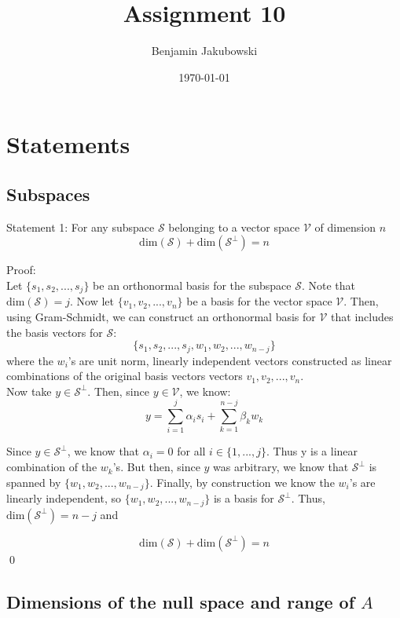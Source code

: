 \documentclass[paper=a4, fontsize=11pt]{scrartcl} %
\title{	Assignment 10}
\author{Benjamin Jakubowski} %
\date{\normalsize\today} %
\numberwithin{equation}{section} %
\numberwithin{figure}{section} %
\numberwithin{table}{section} %
\begin{document}
\maketitle %


\section{Statements}

\subsection{Subspaces}
Statement 1: For any subspace $\mathcal{S}$ belonging to a vector space $\mathcal{V}$ of dimension $n$
\[ \mathrm{dim} (\mathcal{S}) + \mathrm{dim} (\mathcal{S^{\perp}}) = n\]

Proof:\\
Let $\{s_1, s_2, ..., s_j\}$ be an orthonormal basis for the subspace $\mathcal{S}$. Note that $\mathrm{dim}(\mathcal{S}) = j$. Now let $\{v_1, v_2, ..., v_n\}$ be a basis for the vector space $\mathcal{V}$. Then, using Gram-Schmidt, we can construct an orthonormal basis for $\mathcal{V}$ that includes the basis vectors for $\mathcal{S}$:
\[\{s_1, s_2, ..., s_j, w_1, w_2, ..., w_{n-j}\}\]
where the $w_i$'s are unit norm, linearly independent vectors constructed as linear combinations of the original basis vectors vectors $v_1, v_2, ..., v_n$. \\

Now take $y \in \mathcal{S}^{\perp}$. Then, since $y \in \mathcal{V}$, we know:
\[ y = \sum_{i = 1}^{j} \alpha_i s_i + \sum_{k=1}^{n - j} \beta_k w_k\]

Since $y \in \mathcal{S}^{\perp}$, we know that $\alpha_i = 0$ for all $i \in \{1, ..., j\}$. Thus y is a linear combination of the $w_k$'s. But then, since $y$ was arbitrary, we know that $\mathcal{S}^{\perp}$ is spanned by $\{w_1, w_2, ..., w_{n-j}\}$. Finally, by construction we know the $w_i$'s are linearly independent, so $\{w_1, w_2, ..., w_{n-j}\}$ is a basis for $\mathcal{S}^{\perp}$. Thus, $\textrm{dim}(\mathcal{S}^{\perp}) = n-j$ and

\[ \mathrm{dim} (\mathcal{S}) + \mathrm{dim} (\mathcal{S^{\perp}}) = n\] \qed

\subsection{Dimensions of the null space and range of $A$}
\end{document}
